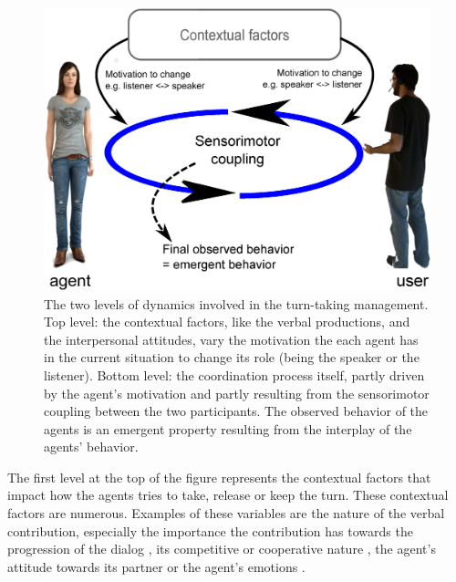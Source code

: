 \begin{figure}
  \centering
  \includegraphics[width=\linewidth]{figure/schema_motivation.eps}

  \caption{The two levels of dynamics involved in the turn-taking management. 
    Top level: the contextual factors, like the verbal productions, and the interpersonal attitudes, vary the motivation the each agent has in the current situation to change its role (being the speaker or the listener). 
Bottom level: the coordination process itself, partly driven by the agent's motivation and partly resulting from the sensorimotor coupling between the two participants. 
The observed behavior of the agents is an emergent property resulting from the interplay of the agents' behavior.}
  \label{fig:mot}
\end{figure}

The first level at the top of the figure represents the contextual factors that impact how the agents tries to take, release or keep the turn. These contextual factors are numerous. Examples of these variables are the nature of the verbal contribution, especially the importance the contribution has towards the progression of the dialog \citep{selfridge_bidding_2009}, its competitive or cooperative nature \citep{cafaro_effects_2016}, the agent's attitude towards its partner \citep{ter_maat_how_2010} or the agent's emotions \citep{ter_maat_turn_2009}.

